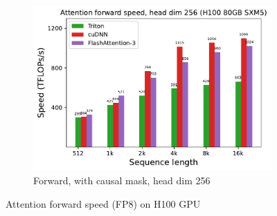 \begin{figure}[ht]
\begin{subfigure}{.5\textwidth}
    \includegraphics[width=.95\linewidth]{figs/flash3_h100_fp8_causal_True_hdim_256_fwd_speed.pdf}
    \caption{Forward, with causal mask, head dim 256}
  \end{subfigure}
  \caption{Attention forward speed (FP8) on H100 GPU}
  \label{fig:benchmark_attn_fwd_full}
\end{figure}

